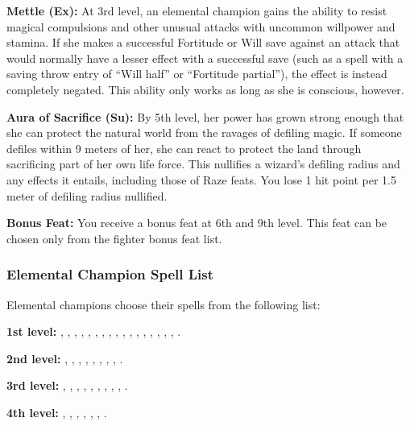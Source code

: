 {\textbf{Mettle (Ex):} At 3rd level, an elemental champion gains the ability to resist magical compulsions and other unusual attacks with uncommon willpower and stamina. If she makes a successful Fortitude or Will save against an attack that would normally have a lesser effect with a successful save (such as a spell with a saving throw entry of ``Will half'' or ``Fortitude partial''), the effect is instead completely negated. This ability only works as long as she is conscious, however.

\textbf{Aura of Sacrifice (Su):} By 5th level, her power has grown strong enough that she can protect the natural world from the ravages of defiling magic. If someone defiles within 9 meters of her, she can react to protect the land through sacrificing part of her own life force. This nullifies a wizard's defiling radius and any effects it entails, including those of Raze feats. You lose 1 hit point per 1.5 meter of defiling radius nullified.

\textbf{Bonus Feat:} You receive a bonus feat at 6th and 9th level. This feat can be chosen only from the fighter bonus feat list.

\subsubsection{Elemental Champion Spell List}
Elemental champions choose their spells from the following list:

\textbf{1st level:} , , , , , , , , , , , , , , , , , .

\textbf{2nd level:} , , , , , , , , .

\textbf{3rd level:} , , , , , , , , , .

\textbf{4th level:} , , , , , , .

}
